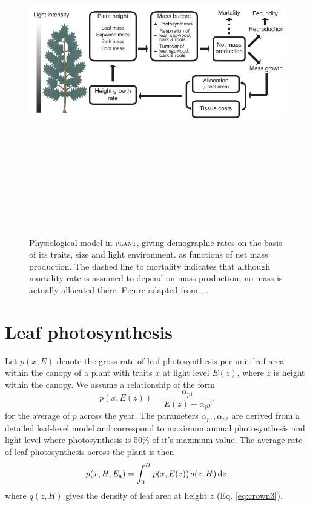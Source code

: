 \documentclass[10pt,twoside]{article}
\newcommand{\plant}{\textsc{plant}}
\begin{document}
\begin{figure}[h!]
\centering
\includegraphics[width=15cm,height=15cm,keepaspectratio]{../figures/schematic-phys}
\caption{Physiological model in {\plant}, giving
demographic rates on the basis of its traits, size and light environment. as functions of
net mass production. The dashed line to mortality indicates that although mortality rate is assumed to depend on mass production, no
mass is actually allocated there. Figure adapted from
\citet{Falster-2011}, \citet{Falster-2015}.}
\label{fig:schematic-phys}
\end{figure}

\section{Leaf photosynthesis}\label{leaf-photosynthesis}

Let \(p(x, E)\) denote the gross rate of leaf photosynthesis per unit
leaf area within the canopy of a plant with traits \(x\) at light
level \(E(z)\), where \(z\) is height within the canopy.
We assume a relationship of the form
\begin{equation}\label{eq:photosynthesis}
p(x, E(z)) = \frac{\alpha_{p1}}{E(z) + \alpha_{p2}},
\end{equation}
for the average of \(p\) across the year. The parameters
\(\alpha_{p1}, \alpha_{p2}\) are derived from a detailed leaf-level
model and correspond to maximum annual photosynthesis and light-level
where photosynthesis is 50\% of it's maximum value. The average rate of
leaf photosynthesis across the plant is then
\begin{equation}\label{eq:photosynthesis_av}
\bar{p}(x, H, E_{\rm a}) = \int_0^H p(x, E(z)) \, q(z, H) \, {\rm d}z,
\end{equation}
where \(q(z, H)\) gives the density of leaf area at height \(z\) (Eq.
\ref{eq:crown3}).
\end{document}
